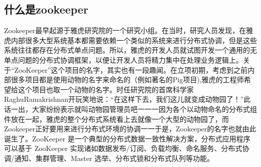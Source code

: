 \documentclass[../../../interview-questions.tex]{subfiles}
\begin{document}
\subsection{什么是zookeeper}

Zookeeper最早起源于雅虎研究院的一个研究小组。在当时，研究人员发现，在雅虎内部很多大型系统基本都需要依赖一个类似的系统来进行分布式协调，但是这些系统往往都存在分布式单点问题。所以，雅虎的开发人员就试图开发一个通用的无单点问题的分布式协调框架，以便让开发人员将精力集中在处理业务逻辑上。关于“ZooKeeper”这个项目的名字，其实也有一段趣闻。在立项初期，考虑到之前内部很多项目都是使用动物的名字来命名的（例如著名的Pig项目),雅虎的工程师希望给这个项目也取一个动物的名字。时任研究院的首席科学家RaghuRamakrishnan开玩笑地说：“在这样下去，我们这儿就变成动物园了！”此话一出，大家纷纷表示就叫动物园管理员吧一一一因为各个以动物命名的分布式组件放在一起，雅虎的整个分布式系统看上去就像一个大型的动物园了，而Zookeeper正好要用来进行分布式环境的协调一一于是，Zookeeper的名字也就由此诞生了。ZooKeeper 是一个典型的分布式数据一致性解决方案，分布式应用程序可以基于 ZooKeeper 实现诸如数据发布/订阅、负载均衡、命名服务、分布式协调/通知、集群管理、Master 选举、分布式锁和分布式队列等功能。
\end{document}
